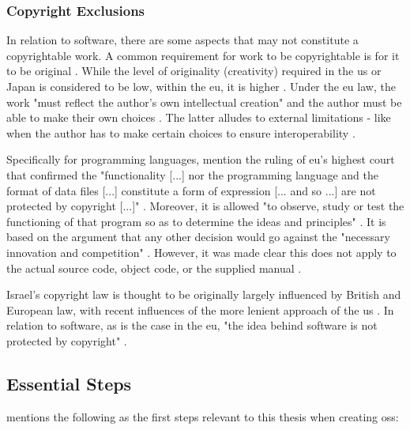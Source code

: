 \subsubsection{Copyright Exclusions}

In relation to software, there are some aspects that may not constitute a copyrightable work.
A common requirement for work to be copyrightable is for it to be original \parencite{Fisher_2016}.
While the level of originality (creativity) required in the \gls{us} or Japan is considered to be low, within the \gls{eu}, it is higher \parencite{Fisher_2016}.
Under the \gls{eu} law, the work "must reflect the author's own intellectual creation" and the author must be able to make their own choices \parencite[p. 443]{Fisher_2016}.
The latter alludes to external limitations - like when the author has to make certain choices to ensure interoperability \parencite{Fisher_2016}.

Specifically for programming languages, \textcite{Rose_2012} mention the ruling of \gls{eu}'s highest court that confirmed the "functionality [...] nor the programming language and the format of data files [...] constitute a form of expression [... and so ...] are not protected by copyright [...]" \parencite{cjeu_2012}.
Moreover, it is allowed "to observe, study or test the functioning of that program so as to determine the ideas and principles" \parencite{cjeu_2012}.
It is based on the argument that any other decision would go against the "necessary innovation and competition" \parencite{Rose_2012}.
However, it was made clear this does not apply to the actual source code, object code, or the supplied manual \parencite{Rose_2012}.

Israel's copyright law is thought to be originally largely influenced by British and European law, with recent influences of the more lenient approach of the \gls{us} \parencite{Greenman_2012}.
In relation to software, as is the case in the \gls{eu}, "the idea behind software is not protected by copyright" \parencite{suslina_approaches_2018}.

\subsection{Essential Steps}
\label{sec:oss-essential-steps}

\textcite[Chapter~2]{Fogel_2022} mentions the following as the first steps relevant to this thesis when creating \gls{oss}:

